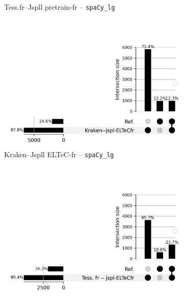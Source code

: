 \begin{figure}[h!]
\begin{minipage}{6.5cm}
\begin{subfigure}{0.8\textwidth}
  \caption{Tess.fr--Jspll pretrain-fr -- \texttt{spaCy\_lg}}
 \label{fig:ELTeCFRA_Tess. fr -- jspl-fr_spacy-lg-concat_intersection.png}
  \end{subfigure}
    \end{minipage}
\begin{minipage}{6.5cm}
  \begin{subfigure}{0.8\textwidth}
  \includegraphics[width=1\textwidth]{IMAGES/ELTeC_INTERSECTIONS_spaCy3.5.1_12072024/DATA_ELTeC-fra_spaCy3.5.1_Kraken--jspl-ELTeCfr_upsetplot.png} 
  \caption{Kraken--Jspll ELTeC-fr -- \texttt{spaCy\_lg}}
  \label{fig:ELTeCFRA_Kraken -- jspl-ELTeCfr_spacy-lg-concat_intersection}
  \end{subfigure}
  \end{minipage}
  \begin{minipage}{6.5cm}
  \begin{subfigure}{0.8\textwidth}
  \includegraphics[width=1\textwidth]{IMAGES/ELTeC_INTERSECTIONS_spaCy3.5.1_12072024/DATA_ELTeC-fra_spaCy3.5.1_Tess. fr -- jspl-ELTeCfr_upsetplot.png} %

\end{subfigure}
\end{minipage}
\end{figure}
